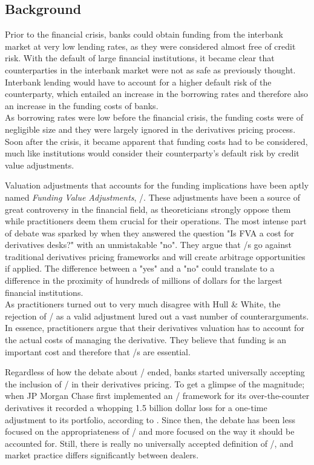 \documentclass[main.tex]{subfiles}
\begin{document}
    \subsection{Background}
        
    Prior to the financial crisis, banks could obtain funding from the interbank market
    at very low lending rates, as they were considered almost free of credit risk.
    With the default of large financial institutions, 
    it became clear that counterparties in the interbank market 
    were not as safe as previously thought.
    Interbank lending would have to account for a higher default risk of the counterparty,
    which entailed an increase in the borrowing rates 
    and therefore also an increase in the funding costs of banks.
    \\
    As borrowing rates were low before the financial crisis, 
    the funding costs were of negligible size 
    and they were largely ignored in the derivatives pricing process.
    Soon after the crisis, it became apparent that funding costs had to be considered,
    much like institutions would consider their counterparty's default risk by 
    credit value adjustments.

    Valuation adjustments that accounts for the funding implications 
    have been aptly named \textit{Funding Value Adjustments}, \FVA/.
    These adjustments have been a source of great controversy in the financial field,
    as theoreticians strongly oppose them while practitioners deem them crucial for their operations.
    The most intense part of debate was sparked by \textcite{HullWhite2012FVA}
    when they answered the question "Is FVA a cost for derivatives desks?" 
    with an unmistakable "no".
    They argue that \FVA/s go against traditional derivatives pricing frameworks
    and will create arbitrage opportunities if applied.
    The difference between a "yes" and a "no" could translate to a difference 
    in the proximity of hundreds of millions of dollars for the largest financial institutions.
    \\
    As practitioners turned out to very much disagree with Hull \& White,
    the rejection of \FVA/ as a valid adjustment lured out a vast number of counterarguments.
    In essence, practitioners argue that their derivatives valuation 
    has to account for the actual costs of managing the derivative.
    They believe that funding is an important cost and therefore that \FVA/s are essential.

    Regardless of how the debate about \FVA/ ended, banks started universally accepting the inclusion of \FVA/
    in their derivatives pricing.
    To get a glimpse of the magnitude; when JP Morgan Chase first implemented an \FVA/ framework
    for its over-the-counter derivatives it recorded a whopping 1.5 billion dollar loss
    for a one-time adjustment to its portfolio, according to \textcite{JPMorganEarnings}.
    Since then, the debate has been less focused on the appropriateness of \FVA/
    and more focused on the way it should be accounted for.
    Still, there is really no universally accepted definition of \FVA/,
    and market practice differs significantly between dealers.
\end{document}
